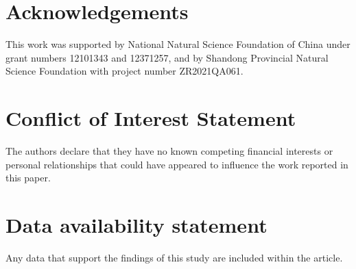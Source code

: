 \documentclass[12pt,a4paper]{article}    %
\numberwithin{equation}{section}
\begin{document}
\section*{Acknowledgements}
This work was supported by National Natural Science Foundation of China under grant numbers 12101343 and 12371257, and by Shandong Provincial Natural Science Foundation with project number ZR2021QA061.

\section*{Conflict of Interest Statement}
The authors declare that they have no known competing financial interests or personal relationships that could have appeared to influence the work reported in this paper.

\section*{Data availability statement}

Any data that support the findings of this study are included within the article.
\end{document}
